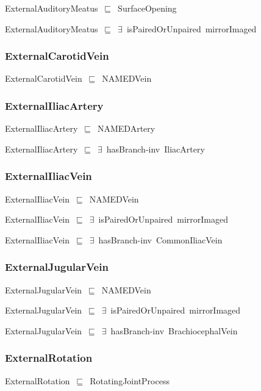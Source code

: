 \documentclass{article}
\begin{document}
ExternalAuditoryMeatus~\ensuremath{\sqsubseteq}~SurfaceOpening~

ExternalAuditoryMeatus~\ensuremath{\sqsubseteq}~\ensuremath{\exists}~isPairedOrUnpaired~mirrorImaged~

\subsubsection*{ExternalCarotidVein}

ExternalCarotidVein~\ensuremath{\sqsubseteq}~NAMEDVein~

\subsubsection*{ExternalIliacArtery}

ExternalIliacArtery~\ensuremath{\sqsubseteq}~NAMEDArtery~

ExternalIliacArtery~\ensuremath{\sqsubseteq}~\ensuremath{\exists}~hasBranch-inv~IliacArtery~

\subsubsection*{ExternalIliacVein}

ExternalIliacVein~\ensuremath{\sqsubseteq}~NAMEDVein~

ExternalIliacVein~\ensuremath{\sqsubseteq}~\ensuremath{\exists}~isPairedOrUnpaired~mirrorImaged~

ExternalIliacVein~\ensuremath{\sqsubseteq}~\ensuremath{\exists}~hasBranch-inv~CommonIliacVein~

\subsubsection*{ExternalJugularVein}

ExternalJugularVein~\ensuremath{\sqsubseteq}~NAMEDVein~

ExternalJugularVein~\ensuremath{\sqsubseteq}~\ensuremath{\exists}~isPairedOrUnpaired~mirrorImaged~

ExternalJugularVein~\ensuremath{\sqsubseteq}~\ensuremath{\exists}~hasBranch-inv~BrachiocephalVein~

\subsubsection*{ExternalRotation}

ExternalRotation~\ensuremath{\sqsubseteq}~RotatingJointProcess~
\end{document}
